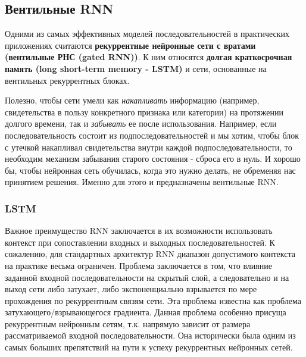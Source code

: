 
\subsection{Вентильные RNN}

Одними из самых эффективных моделей последовательностей в практических 
приложениях считаются \textbf{рекуррентные нейронные сети с вратами 
(вентильные РНС (gated RNN))}. К ним относятся
\textbf{долгая краткосрочная память (long short-term memory - LSTM)} 
и сети, основанные на вентильных рекуррентных блоках. 

Полезно, чтобы сети умели как \textit{накапливать} информацию 
(например, свидетельства в пользу конкретного признака или категории) на 
протяжении долгого времени, так и \textit{забывать} ее после использования. 
Например, если последовательность состоит из подпоследовательностей 
и мы хотим, чтобы блок с утечкой накапливал свидетельства
внутри каждой подпоследовательности, то необходим механизм забывания старого
состояния - сброса его в нуль. И хорошо бы, чтобы нейронная сеть обучилась, 
когда это нужно делать, не обременяя нас принятием решения. 
Именно для этого и предназначены вентильные RNN.

\subsubsection{LSTM}

Важное преимущество RNN заключается в их возможности использовать 
контекст при сопоставлении входных и выходных последовательностей. 
К сожалению, для стандартных архитектур RNN диапазон допустимого контекста 
на практике весьма ограничен. Проблема заключается в том, что влияние 
заданной входной последовательности на скрытый слой, а следовательно и 
на выход сети либо затухает, либо экспоненциально взрывается по мере 
прохождения по рекуррентным связям сети. Эта проблема известна как проблема 
затухающего/взрывающегося градиента. Данная проблема особенно присуща 
рекуррентным нейронным сетям, т.к. напрямую зависит от размера рассматриваемой 
входной последовательности. Она исторически была одним из самых 
больших препятствий на пути к успеху рекуррентных нейронных сетей.

